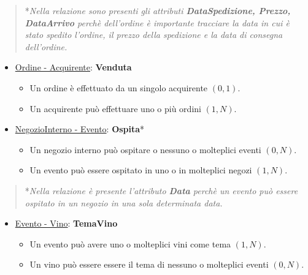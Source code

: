 \begin{verse}
	*\emph{Nella relazione sono presenti gli attributi \textbf{DataSpedizione, Prezzo, DataArrivo} perchè dell'ordine è importante tracciare la data in cui è stato spedito l'ordine, il prezzo della spedizione e la data di consegna dell'ordine.}
\end{verse}

\begin{itemize}
	\item \underline{Ordine - Acquirente}: \textbf{Venduta}
	
	\begin{itemize}
		\item Un ordine è effettuato da un singolo acquirente $(0,1)$.
		\item Un acquirente può effettuare uno o più ordini $(1,N)$.
	\end{itemize}
	
\end{itemize}

\begin{itemize}
	\item \underline{NegozioInterno - Evento}: \textbf{Ospita}*
	
	\begin{itemize}
		\item Un negozio interno può ospitare o nessuno o molteplici eventi $(0,N)$.
		\item Un evento può essere ospitato in uno o in molteplici negozi $(1,N)$.
	\end{itemize}
	
\end{itemize}

\begin{verse}
	*\emph{Nella relazione è presente l'attributo \textbf{Data} perchè un evento può essere ospitato in un negozio in una sola determinata data.}
\end{verse}


\begin{itemize}
	\item \underline{Evento - Vino}: \textbf{TemaVino}
	
	\begin{itemize}
		\item Un evento può avere uno o molteplici vini come tema $(1,N)$.
		\item Un vino può essere essere il tema di nessuno o molteplici eventi $(0,N)$.
	\end{itemize}
	
\end{itemize}

